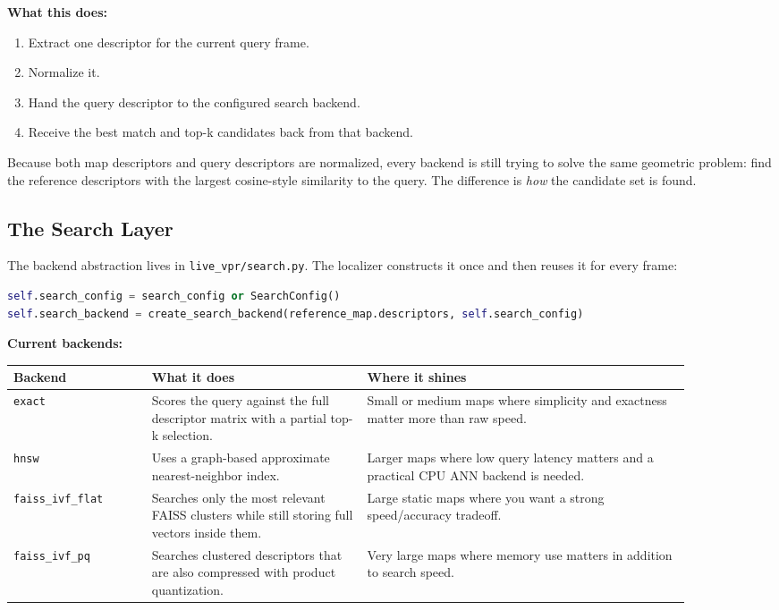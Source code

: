 \documentclass[11pt]{article}
\newcommand{\file}[1]{\texttt{#1}}
\begin{document}
\textbf{What this does:}

\begin{enumerate}[leftmargin=*]
  \item Extract one descriptor for the current query frame.
  \item Normalize it.
  \item Hand the query descriptor to the configured search backend.
  \item Receive the best match and top-k candidates back from that backend.
\end{enumerate}

Because both map descriptors and query descriptors are normalized, every backend is still trying to solve the same geometric problem: find the reference descriptors with the largest cosine-style similarity to the query. The difference is \emph{how} the candidate set is found.

\subsection{The Search Layer}
The backend abstraction lives in \file{live\_vpr/search.py}. The localizer constructs it once and then reuses it for every frame:

\begin{lstlisting}[style=repo,language=Python,caption={Search backend construction.}]
self.search_config = search_config or SearchConfig()
self.search_backend = create_search_backend(reference_map.descriptors, self.search_config)
\end{lstlisting}

\textbf{Current backends:}

\begin{longtable}{p{0.18\linewidth} p{0.28\linewidth} p{0.42\linewidth}}
\toprule
\textbf{Backend} & \textbf{What it does} & \textbf{Where it shines} \\
\midrule
\texttt{exact} & Scores the query against the full descriptor matrix with a partial top-k selection. & Small or medium maps where simplicity and exactness matter more than raw speed. \\
\texttt{hnsw} & Uses a graph-based approximate nearest-neighbor index. & Larger maps where low query latency matters and a practical CPU ANN backend is needed. \\
\texttt{faiss\_ivf\_flat} & Searches only the most relevant FAISS clusters while still storing full vectors inside them. & Large static maps where you want a strong speed/accuracy tradeoff. \\
\texttt{faiss\_ivf\_pq} & Searches clustered descriptors that are also compressed with product quantization. & Very large maps where memory use matters in addition to search speed. \\
\bottomrule
\end{longtable}
\end{document}
